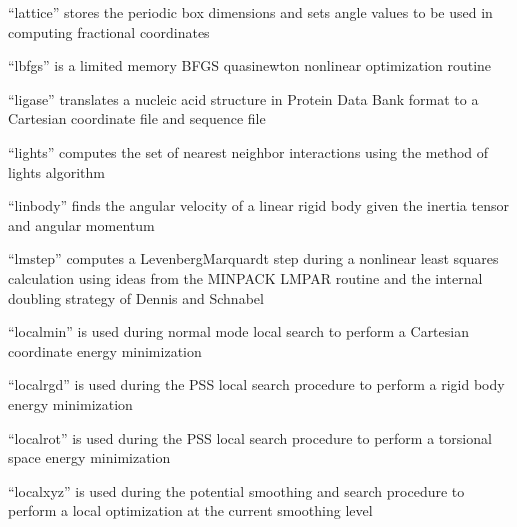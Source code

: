 \documentclass[letterpaper,11pt,english]{sphinxmanual}
\begin{document}
\sphinxAtStartPar
{}

\sphinxAtStartPar
“lattice” stores the periodic box dimensions and sets angle values to be used in computing fractional coordinates

\sphinxAtStartPar
{}

\sphinxAtStartPar
“lbfgs” is a limited memory BFGS quasi\sphinxhyphen{}newton nonlinear optimization routine

\sphinxAtStartPar
{}

\sphinxAtStartPar
“ligase” translates a nucleic acid structure in Protein Data Bank format to a Cartesian coordinate file and sequence file

\sphinxAtStartPar
{}

\sphinxAtStartPar
“lights” computes the set of nearest neighbor interactions using the method of lights algorithm

\sphinxAtStartPar
{}

\sphinxAtStartPar
“linbody” finds the angular velocity of a linear rigid body given the inertia tensor and angular momentum

\sphinxAtStartPar
{}

\sphinxAtStartPar
“lmstep” computes a Levenberg\sphinxhyphen{}Marquardt step during a nonlinear least squares calculation using ideas from the MINPACK LMPAR routine and the internal doubling strategy of Dennis and Schnabel

\sphinxAtStartPar
{}

\sphinxAtStartPar
“localmin” is used during normal mode local search to perform a Cartesian coordinate energy minimization

\sphinxAtStartPar
{}

\sphinxAtStartPar
“localrgd” is used during the PSS local search procedure to perform a rigid body energy minimization

\sphinxAtStartPar
{}

\sphinxAtStartPar
“localrot” is used during the PSS local search procedure to perform a torsional space energy minimization

\sphinxAtStartPar
{}

\sphinxAtStartPar
“localxyz” is used during the potential smoothing and search procedure to perform a local optimization at the current smoothing level
\end{document}
